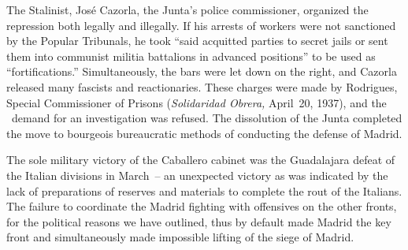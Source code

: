 \indexCNT
The Stalinist, José Cazorla, the Junta’s police commissioner\kn, organized the repression both legally and illegally. If his arrests of workers were not sanctioned by the Popular Tribunals, he took ``said acquitted parties to secret jails or sent them into communist militia battalions in advanced positions'' to be used as ``fortifications.\kn\kn'' Simultaneously, the bars were let down on the right, and Cazorla released many fascists and reactionaries. These charges were made by Rodrigues, Special Commissioner of Prisons (\emph{Solidaridad Obrera,} April~20, 1937), and the \CNT\ demand for an investigation was refused. The dissolution of the Junta completed the move to bourgeois bureaucratic methods of conducting the defense of Madrid.

\indexLCaballero{}
The sole military victory of the Caballero cabinet was the Guadalajara defeat of the Italian divisions in March~-- an unexpected victory as was indicated by the lack of preparations of reserves and materials to complete the rout of the Italians. The failure to coordinate the Madrid fighting with offensives on the other fronts, for the political reasons we have outlined, thus by default made Madrid the key front and simultaneously made impossible lifting of the siege of Madrid.